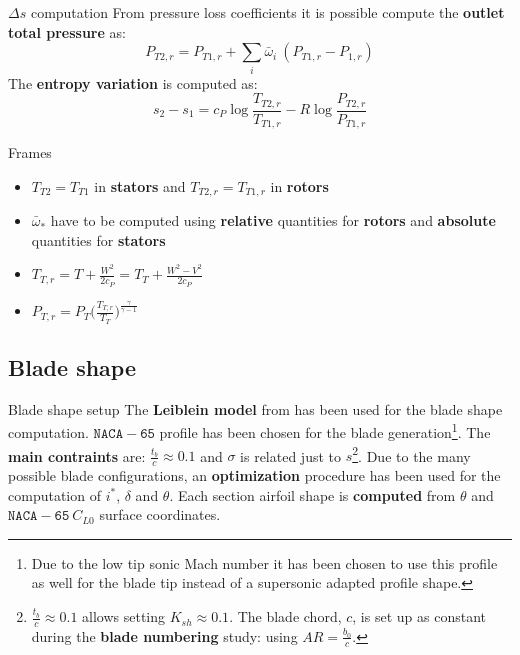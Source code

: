 	\begin{frame}{$\Delta s$ computation}
		From pressure loss coefficients it is possible compute the \textbf{outlet total pressure} as: 
		\begin{equation}
			P_{T2,r} = P_{T1,r} + \sum_i \bar{\omega}_{i} \ (P_{T1,r} - P_{1,r}) \nonumber
		\end{equation}
		The \textbf{entropy variation} is computed as: 
		\begin{equation}
			 s_2 - s_1 = c_P \log{\frac{T_{T2,r}}{T_{T1,r}}} - R \log{\frac{P_{T2,r}}{P_{T1,r}}} \nonumber
		\end{equation}
		\vspace{-0.5cm}
		\begin{alertblock}{Frames}
			\begin{itemize}
				\item $T_{T2} = T_{T1}$ in \textbf{stators} and $T_{T2,r} = T_{T1,r}$ in \textbf{rotors}
				\item $\bar{\omega}_{*}$ have to be computed using \textbf{relative} quantities for \textbf{rotors} and \textbf{absolute} quantities for \textbf{stators}
				\item $T_{T,r} = T + \frac{W^2}{2 c_P} = T_T + \frac{W^2 - V^2}{2 c_P}$
				\item $P_{T,r} = P_T \Big( \frac{T_{T,r}}{T_T} \Big)^{\frac{\gamma}{\gamma - 1}}$
			\end{itemize}
		\end{alertblock}
	\end{frame}
	
\subsection{Blade shape}
	{\nologo
	\begin{frame}{Blade shape setup}
		The \textbf{Leiblein model} from \cite[Ch. 6]{axial2004} has been used for the blade shape computation. 
		\newline 
		\newline
		$\mathtt{NACA-65}$ profile has been chosen for the blade generation\footnote{Due to the low tip sonic Mach number it has been chosen to use this profile as well for the blade tip instead of a supersonic adapted profile shape.}.
		\newline
		\newline
		The \textbf{main contraints} are: $\frac{t_b}{c} \approx 0.1$ and $\sigma$ is related just to $s$\footnote{$\frac{t_b}{c} \approx 0.1$ allows setting $K_{sh} \approx 0.1$. The blade chord, $c$, is set up as constant during the \textbf{blade numbering} study: using $AR = \frac{b_0}{c}$.}.
		\newline
		\newline
		Due to the many possible blade configurations, an \textbf{optimization} procedure has been used for the computation of $i^{*}$, $\delta$ and $\theta$. 
		\newline
		\newline
		Each section airfoil shape is \textbf{computed} from $\theta$ and $\mathtt{NACA-65} \ C_{L0}$ surface coordinates.
	\end{frame}
	}

